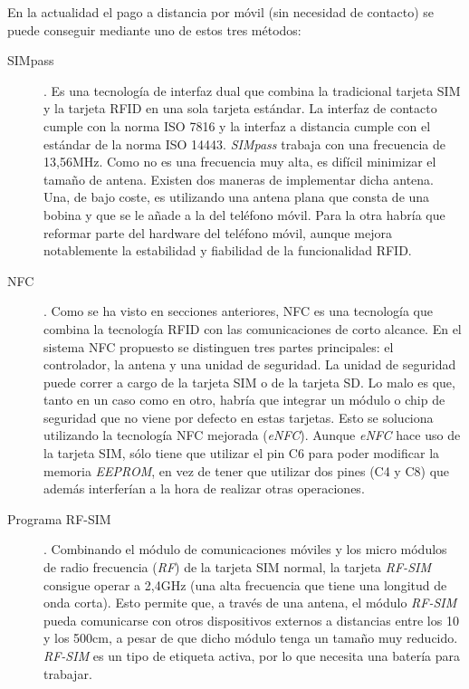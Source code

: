   En la actualidad el pago a distancia por móvil (sin necesidad de contacto) 
  se puede conseguir mediante uno de estos tres métodos:
  \begin{description}
  \item[SIMpass]. Es una tecnología de interfaz dual que combina la
  tradicional tarjeta \acs{SIM} y la tarjeta \acs{RFID} en una sola tarjeta
  estándar. La interfaz de contacto cumple con la norma \acs{ISO} 7816 y la
  interfaz a distancia cumple con el estándar de la norma \acs{ISO} 14443.
  \emph{SIMpass} trabaja con una frecuencia de 13,56MHz. Como no es una
  frecuencia muy alta, es difícil minimizar el tamaño de antena. Existen dos
  maneras de implementar dicha antena. Una, de bajo coste, es utilizando una 
  antena plana que consta de una bobina y que se le añade a la del teléfono
  móvil. Para la otra habría que reformar parte del hardware del teléfono
  móvil, aunque mejora notablemente la estabilidad y fiabilidad de la
  funcionalidad \acs{RFID}.

  \item[\acs{NFC}]. Como se ha visto en secciones anteriores, \acs{NFC} es una
  tecnología que combina la tecnología \acs{RFID} con las comunicaciones de
  corto alcance. En el sistema \acs{NFC} propuesto se distinguen tres partes 
  principales: el controlador, la antena y una unidad de seguridad. La unidad
  de seguridad puede correr a cargo de la tarjeta \acs{SIM} o de la tarjeta
  \acs{SD}. Lo malo es que, tanto en un caso como en otro, habría que integrar
  un módulo o chip de seguridad que no viene por defecto en estas tarjetas.
  Esto se soluciona utilizando la tecnología \acs{NFC} mejorada (\emph{eNFC}).
  Aunque \emph{eNFC} hace uso de la tarjeta \acs{SIM}, sólo tiene que utilizar
  el pin C6 para poder modificar la memoria \emph{EEPROM}, en vez de tener
  que utilizar dos pines (C4 y C8) que además interferían a la hora de
  realizar otras operaciones.

    \item[Programa RF-SIM]. Combinando el módulo de comunicaciones móviles y
  los micro módulos de radio frecuencia (\emph{RF}) de la tarjeta \acs{SIM}
  normal, la tarjeta \emph{RF-SIM} consigue operar a 2,4GHz (una alta 
  frecuencia que tiene una longitud de onda corta). Esto permite que, a través
  de una antena, el módulo \emph{RF-SIM} pueda comunicarse con otros 
  dispositivos externos a distancias entre los 10 y los 500cm, a pesar de que
  dicho módulo tenga un tamaño muy reducido. \emph{RF-SIM} es un tipo de
  etiqueta activa, por lo que necesita una batería para trabajar.
  \end{description}

